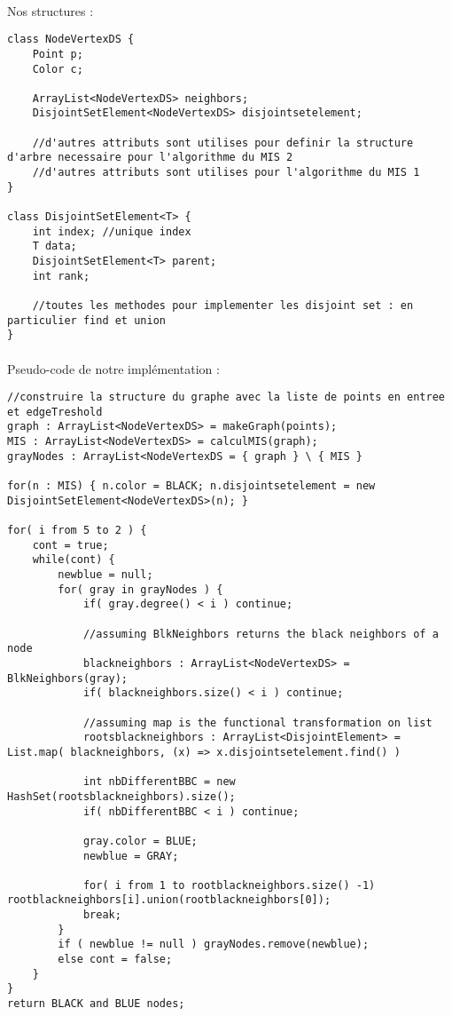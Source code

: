 \paragraph{}
Nos structures :
\begin{lstlisting}
class NodeVertexDS {
	Point p;
	Color c;
	
	ArrayList<NodeVertexDS> neighbors;
	DisjointSetElement<NodeVertexDS> disjointsetelement;
	
	//d'autres attributs sont utilises pour definir la structure d'arbre necessaire pour l'algorithme du MIS 2
	//d'autres attributs sont utilises pour l'algorithme du MIS 1
}

class DisjointSetElement<T> {
	int index; //unique index
	T data;
	DisjointSetElement<T> parent;
	int rank;
	
	//toutes les methodes pour implementer les disjoint set : en particulier find et union
}
\end{lstlisting}

\paragraph{}
Pseudo-code de notre implémentation :

\begin{lstlisting}
//construire la structure du graphe avec la liste de points en entree et edgeTreshold
graph : ArrayList<NodeVertexDS> = makeGraph(points);
MIS : ArrayList<NodeVertexDS> = calculMIS(graph);
grayNodes : ArrayList<NodeVertexDS = { graph } \ { MIS }

for(n : MIS) { n.color = BLACK; n.disjointsetelement = new DisjointSetElement<NodeVertexDS>(n); }

for( i from 5 to 2 ) {
	cont = true;
	while(cont) {
		newblue = null;
		for( gray in grayNodes ) {
			if( gray.degree() < i ) continue;
			
			//assuming BlkNeighbors returns the black neighbors of a node
			blackneighbors : ArrayList<NodeVertexDS> = BlkNeighbors(gray);
			if( blackneighbors.size() < i ) continue;
			
			//assuming map is the functional transformation on list
			rootsblackneighbors : ArrayList<DisjointElement> = List.map( blackneighbors, (x) => x.disjointsetelement.find() )
			
			int nbDifferentBBC = new HashSet(rootsblackneighbors).size();
			if( nbDifferentBBC < i ) continue;
			
			gray.color = BLUE;
			newblue = GRAY;
			
			for( i from 1 to rootblackneighbors.size() -1) rootblackneighbors[i].union(rootblackneighbors[0]);
			break;
		}
		if ( newblue != null ) grayNodes.remove(newblue);
		else cont = false;
	}
}
return BLACK and BLUE nodes;
\end{lstlisting}

